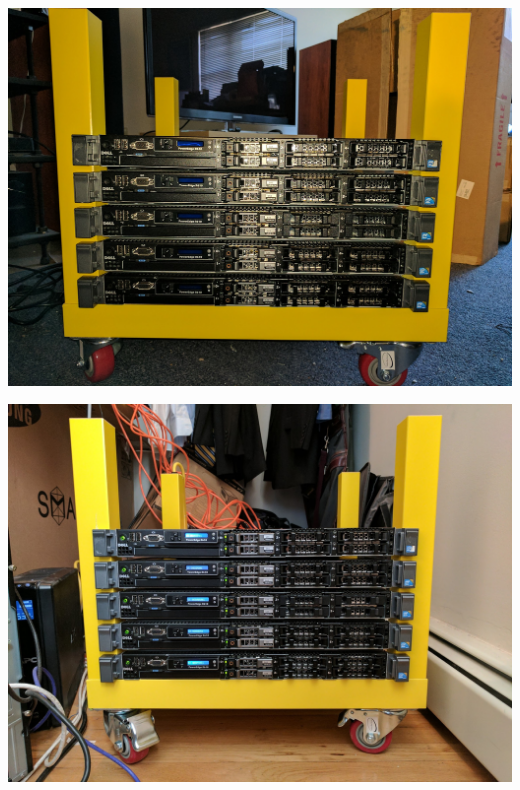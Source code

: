 \documentclass[aspectratio=169,11pt,hyperref={colorlinks=true}]{beamer}
\begin{document}
\begin{frame}
    \centering
    \includegraphics[width=.75\textwidth]{lack_rack.jpg}
\end{frame}

\begin{frame}
    \centering
    \includegraphics[width=.9\textwidth]{data_closet.jpg}
\end{frame}
\end{document}
